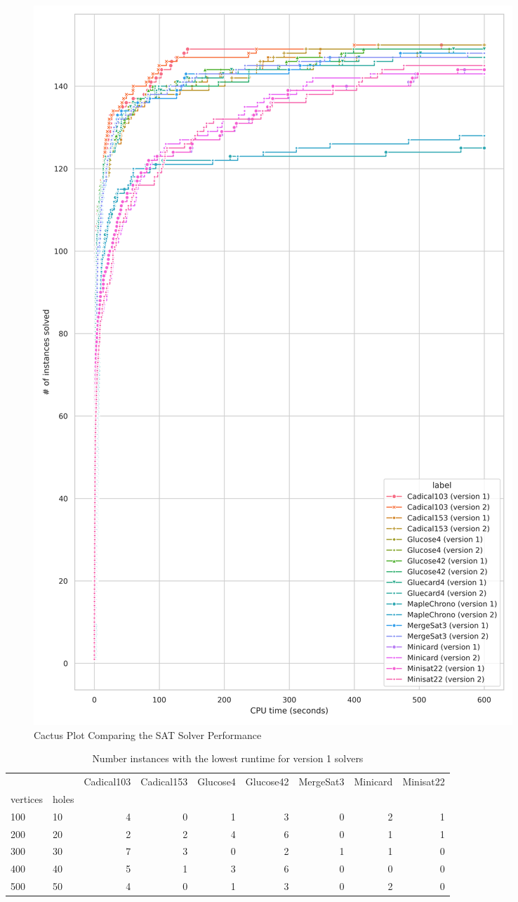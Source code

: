 \begin{figure}[htbp]
\centering
\includegraphics[scale=0.7]{Thesis/figures/minibenchmark_cactus_plot_runtime_SAT_with_holes.png}
\caption{Cactus Plot Comparing the SAT Solver Performance}
\label{fig:cactus_SAT}
\end{figure}

\begin{table}[htbp]
\tiny
\centering
\begin{tabular}{llrrrrrrr}
\toprule
 &  & Cadical103 & Cadical153 & Glucose4 & Glucose42 & MergeSat3 & Minicard & Minisat22 \\
vertices & holes &  &  &  &  &  &  &  \\
\midrule
100 & 10 & 4 & 0 & 1 & 3 & 0 & 2 & 1 \\
\cline{1-9}
200 & 20 & 2 & 2 & 4 & 6 & 0 & 1 & 1 \\
\cline{1-9}
300 & 30 & 7 & 3 & 0 & 2 & 1 & 1 & 0 \\
\cline{1-9}
400 & 40 & 5 & 1 & 3 & 6 & 0 & 0 & 0 \\
\cline{1-9}
500 & 50 & 4 & 0 & 1 & 3 & 0 & 2 & 0 \\
\cline{1-9}
\bottomrule
\end{tabular}
\caption{Number instances with the lowest runtime for version 1 solvers}
\label{tab:SAT_small_time_v2}
\end{table}

